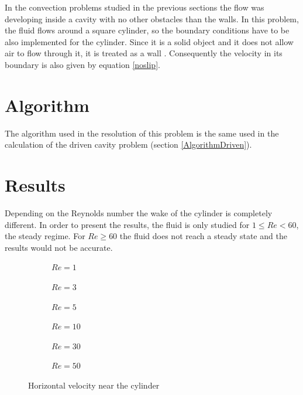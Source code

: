 In the convection problems studied in the previous sections the flow was developing inside a cavity with no other obstacles than the walls. In this problem, the fluid flows around a square cylinder, so the boundary conditions have to be also implemented for the cylinder. Since it is a solid object and it does not allow air to flow through it, it is treated as a wall \cite{Ferziger2002}. Consequently the velocity in its boundary is also given by equation \ref{noslip}.

\section{Algorithm}
The algorithm used in the resolution of this problem is the same used in the calculation of the driven cavity problem (section \ref{AlgorithmDriven}).

\section{Results}
Depending on the Reynolds number the wake of the cylinder is completely different. In order to present the results, the fluid is only studied for $1\leq Re<60$, the steady regime. For $Re\geq60$ the fluid does not reach a steady state and the results would not be accurate.

\begin{figure}[h]
	\centering
	\begin{subfigure}{0.5\textwidth}
		\resizebox{1.1\textwidth}{!}{}
		\caption{$Re=1$}
	\end{subfigure}%
	\begin{subfigure}{0.5\textwidth}
		\resizebox{1.1\textwidth}{!}{}
		\caption{$Re=3$}
	\end{subfigure}
	\begin{subfigure}{0.5\textwidth}
		\resizebox{1.1\textwidth}{!}{}
		\caption{$Re=5$}
	\end{subfigure}%
	\begin{subfigure}{0.5\textwidth}
		\resizebox{1.1\textwidth}{!}{}
		\caption{$Re=10$}
	\end{subfigure}
	\begin{subfigure}{0.5\textwidth}
		\resizebox{1.1\textwidth}{!}{}
		\caption{$Re=30$}
	\end{subfigure}%
	\begin{subfigure}{0.5\textwidth}
		\resizebox{1.1\textwidth}{!}{}
		\caption{$Re=50$}
	\end{subfigure}
\caption{Horizontal velocity near the cylinder}
\label{HorizontalCylinder}
\end{figure}

